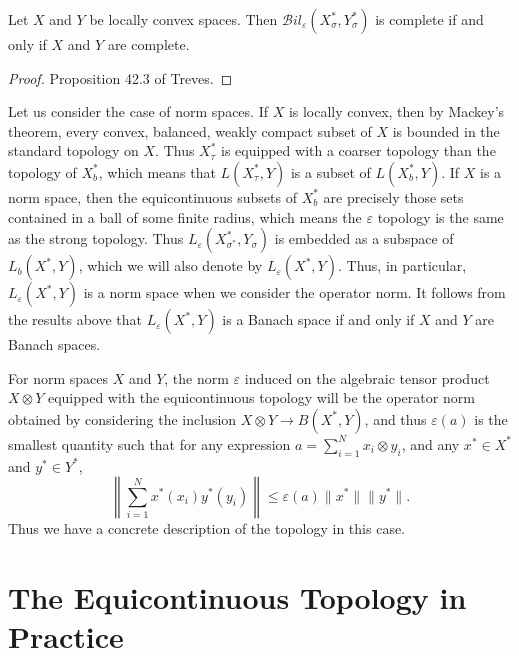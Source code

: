 \begin{theorem}
    Let $X$ and $Y$ be locally convex spaces. Then $\mathcal{B}il_\varepsilon(X^*_\sigma, Y^*_\sigma)$ is complete if and only if $X$ and $Y$ are complete.
\end{theorem}
\begin{proof}
    Proposition 42.3 of Treves.
\end{proof}

Let us consider the case of norm spaces. If $X$ is locally convex, then by Mackey's theorem, every convex, balanced, weakly compact subset of $X$ is bounded in the standard topology on $X$. Thus $X^*_\tau$ is equipped with a coarser topology than the topology of $X^*_b$, which means that $L(X^*_\tau, Y)$ is a subset of $L(X^*_b,Y)$. If $X$ is a norm space, then the equicontinuous subsets of $X^*_b$ are precisely those sets contained in a ball of some finite radius, which means the $\varepsilon$ topology is the same as the strong topology. Thus $L_\varepsilon(X^*_{\sigma^*}, Y_\sigma)$ is embedded as a subspace of $L_b(X^*, Y)$, which we will also denote by $L_\varepsilon(X^*,Y)$. Thus, in particular, $L_\varepsilon(X^*,Y)$ is a norm space when we consider the operator norm. It follows from the results above that $L_\varepsilon(X^*,Y)$ is a Banach space if and only if $X$ and $Y$ are Banach spaces.

For norm spaces $X$ and $Y$, the norm $\varepsilon$ induced on the algebraic tensor product $X \otimes Y$ equipped with the equicontinuous topology will be the operator norm obtained by considering the inclusion $X \otimes Y \to B(X^*,Y)$, and thus $\varepsilon(a)$ is the smallest quantity such that for any expression $a = \sum_{i = 1}^N x_i \otimes y_i$, and any $x^* \in X^*$ and $y^* \in Y^*$,
%
\[ \left\| \sum_{i = 1}^N x^*(x_i) y^*(y_i) \right\| \leq \varepsilon(a) \| x^* \| \| y^* \|.  \]
%
Thus we have a concrete description of the topology in this case.

\section{The Equicontinuous Topology in Practice}


